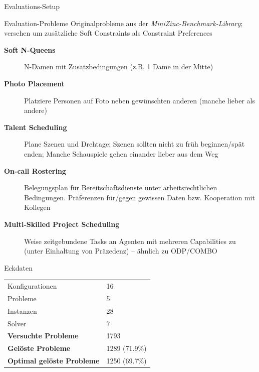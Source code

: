 \begin{frame}{Evaluations-Setup}

\end{frame}

\begin{frame}{Evaluation-Probleme}
Originalprobleme aus der \emph{MiniZinc-Benchmark-Library}; versehen um zusätzliche Soft Constraints als Constraint Preferences

\vspace*{1ex}

\begin{description}
\item[\textbf{Soft N-Queens}] N-Damen mit Zusatzbedingungen (z.B. 1 Dame in der Mitte)
\item[\textbf{Photo Placement}] Platziere Personen auf Foto neben gewünschten anderen (manche lieber als andere)
\item[\textbf{Talent Scheduling}] Plane Szenen und Drehtage; Szenen sollten nicht zu früh beginnen/spät enden; Manche Schauspiele gehen einander lieber aus dem Weg
\item[\textbf{On-call Rostering}] Belegungsplan für Bereitschaftsdienste unter arbeitsrechtlichen Bedingungen. Präferenzen für/gegen gewissen Daten bzw. Kooperation mit Kollegen
\item[\textbf{Multi-Skilled Project Scheduling}] Weise zeitgebundene Tasks an Agenten mit mehreren Capabilities zu (unter Einhaltung von Präzedenz) -- ähnlich zu ODP/COMBO
\end{description}

\end{frame}

\begin{frame}{Eckdaten}

\begin{table}
\centering
{
\label{tab:resultsSolverComparison}

\begin{tabular}{l|l}
\toprule
Konfigurationen &  16 \\
Probleme & 5 \\
Instanzen & 28 \\
Solver & 7 \\
\midrule
\textbf{Versuchte Probleme} & 1793 \\
\textbf{Gelöste Probleme} & 1289 (71.9\%) \\
\textbf{Optimal gelöste Probleme} & 1250 (69.7\%) \\
\bottomrule
\end{tabular}

}
\end{table}
\end{frame}

